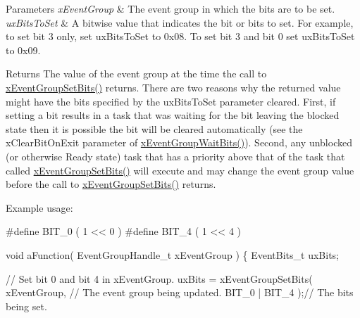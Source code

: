 \begin{DoxyParams}{Parameters}
{\em x\+Event\+Group} & The event group in which the bits are to be set.\\
\hline
{\em ux\+Bits\+To\+Set} & A bitwise value that indicates the bit or bits to set. For example, to set bit 3 only, set ux\+Bits\+To\+Set to 0x08. To set bit 3 and bit 0 set ux\+Bits\+To\+Set to 0x09.\\
\hline
\end{DoxyParams}
\begin{DoxyReturn}{Returns}
The value of the event group at the time the call to \hyperlink{externals_2freertos_2include_2event__groups_8h_a02d7b3bb55f7e11d9c47116266c5fb2e}{x\+Event\+Group\+Set\+Bits()} returns. There are two reasons why the returned value might have the bits specified by the ux\+Bits\+To\+Set parameter cleared. First, if setting a bit results in a task that was waiting for the bit leaving the blocked state then it is possible the bit will be cleared automatically (see the x\+Clear\+Bit\+On\+Exit parameter of \hyperlink{externals_2freertos_2include_2event__groups_8h_aab9d5b405bc57b7624dcabe9a9a503db}{x\+Event\+Group\+Wait\+Bits()}). Second, any unblocked (or otherwise Ready state) task that has a priority above that of the task that called \hyperlink{externals_2freertos_2include_2event__groups_8h_a02d7b3bb55f7e11d9c47116266c5fb2e}{x\+Event\+Group\+Set\+Bits()} will execute and may change the event group value before the call to \hyperlink{externals_2freertos_2include_2event__groups_8h_a02d7b3bb55f7e11d9c47116266c5fb2e}{x\+Event\+Group\+Set\+Bits()} returns.
\end{DoxyReturn}
Example usage\+: 
\begin{DoxyPre}
  #define BIT\_0 ( 1 << 0 )
  #define BIT\_4 ( 1 << 4 )\end{DoxyPre}



\begin{DoxyPre}  void aFunction( EventGroupHandle\_t xEventGroup )
  \{
  EventBits\_t uxBits;\end{DoxyPre}



\begin{DoxyPre}    // Set bit 0 and bit 4 in xEventGroup.
    uxBits = xEventGroupSetBits(
                        xEventGroup,    // The event group being updated.
                        BIT\_0 | BIT\_4 );// The bits being set.\end{DoxyPre}



